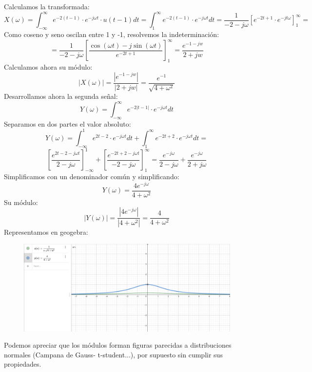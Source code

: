 \documentclass[12pt,a4paper,oneside,onecolumn]{article}
\begin{document}
     \section{}
     Calculamos la transformada:
     \[
        X(\omega) = \int_{-\infty}^{\infty}{e^{-2(t-1)}\cdot e^{-j\omega t} \cdot u(t-1) dt} = \int_{1}^{\infty}{e^{-2(t-1)}\cdot e^{-j\omega t} dt} = \frac{1}{-2-j\omega}\left[e^{-2t+1}\cdot e^{-jt\omega} \right]^\infty_1 = 
     \]
     Como coseno y seno oscilan entre 1 y -1, resolvemos la indeterminaci\'on:
    \[
        = \frac{1}{-2-j\omega}\left[ \frac{\cos{(\omega t)} - j\sin{(\omega t)}}{e^{-2t + 1}} \right]^\infty_1 = \frac{e^{-1 -jw}}{2 + jw}
    \]
    Calculamos ahora su m\'odulo:
    \[
        |X(\omega)| = \frac{|e^{-1 -jw}|}{|2 + jw|} = \frac{e^{-1}}{\sqrt{4 + \omega ^2}}
    \]
    Desarrollamos ahora la segunda se\~nal:
    \[
        Y(\omega) = \int_{-\infty}^{\infty}{e^{-2|t-1|}\cdot e^{-j\omega t}}dt 
    \]
    Separamos en dos partes el valor absoluto: 
    \[
        Y(\omega) = \int_{-\infty}^{1}{{e^{2t-2}}\cdot e^{-j\omega t}}dt + \int_{1}^{\infty}{{e^{-2t+2}}\cdot e^{-j\omega t}}dt =
    \]
    \[
        \left [\frac{e^{2t-2-j\omega t}}{2-j\omega} \right]^{1}_{-\infty} + \left [\frac{e^{-2t+2-j\omega t}}{-2-j\omega} \right]^{\infty}_{1} = \frac{e^{-j\omega}}{2-j\omega} + \frac{e^{-j\omega}}{2+j\omega}
    \]
    Simplificamos con un denominador com\'un y simplificando:
    \[
        Y(\omega) = \frac{4e^{-j\omega}}{4+\omega ^{2}}
    \]
    Su m\'odulo:
    \[
        |Y(\omega)| = \frac{|4e^{-j\omega}|}{|4+\omega ^{2}|} = \frac{4}{4+\omega ^ 2}
    \]
    Representamos en geogebra:
    \begin{figure}[!h]
		\centering
		\includegraphics[scale=0.3]{campanas.png}
		\caption{}
		\label{fig:1}
	\end{figure}
	Podemos apreciar que los m\'odulos forman figuras parecidas a distribuciones normales (Campana de Gauss- t-student...), por supuesto sin cumplir sus propiedades.
	
\end{document}
